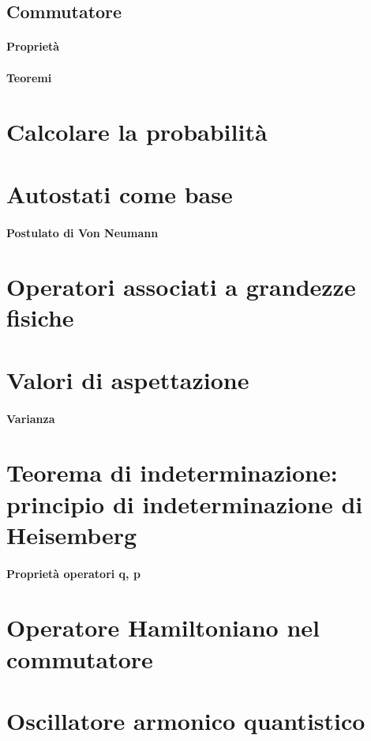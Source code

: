 \documentclass[]{article}
\begin{document}
\subsection{Commutatore}
	\paragraph{Proprietà}
	\paragraph{Teoremi}
	
	
\section{Calcolare la probabilità}
	
\section{Autostati come base}
	\paragraph{Postulato di Von Neumann}
	
\section{Operatori associati a grandezze fisiche}

\section{Valori di aspettazione}
	\paragraph{Varianza}
	
\section{Teorema di indeterminazione: principio di indeterminazione di Heisemberg}
	\paragraph{Proprietà operatori q, p}
	
	
\section{Operatore Hamiltoniano nel commutatore}








\section{Oscillatore armonico quantistico}
\end{document}
